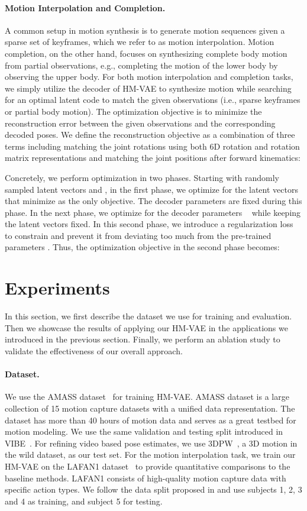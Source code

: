 \paragraph{Motion Interpolation and Completion.}
A common setup in motion synthesis is to generate motion sequences given a sparse set of keyframes, which we refer to as motion interpolation. Motion completion, on the other hand, focuses on synthesizing complete body motion from partial observations, e.g., completing the motion of the lower body by observing the upper body. For both motion interpolation and completion tasks, we simply utilize the decoder of HM-VAE to synthesize motion while searching for an optimal latent code to match the given observations (i.e., sparse keyframes or partial body motion). The optimization objective is to minimize the reconstruction error between the given observations and the corresponding decoded poses. We define the reconstruction objective as a combination of three terms including matching the joint rotations using both 6D rotation and rotation matrix representations and matching the joint positions after forward kinematics:

Concretely, we perform optimization in two phases. Starting with randomly sampled latent vectors  and , in the first phase, we optimize for the latent vectors that minimize  as the only objective. The decoder parameters  are fixed during this phase. In the next phase, we optimize for the decoder parameters ~\cite{yang2020deep} while keeping the latent vectors fixed. In this second phase, we introduce a regularization loss to constrain  and prevent it from deviating too much from the pre-trained parameters . Thus, the optimization objective in the second phase becomes:  


\section{Experiments}
In this section, we first describe the dataset we use for training and evaluation. Then we showcase the results of applying our HM-VAE in the applications we introduced in the previous section. Finally, we perform an ablation study to validate the effectiveness of our overall approach. 

\paragraph{Dataset.}
We use the AMASS dataset~\cite{mahmood2019amass} for training HM-VAE. AMASS dataset is a large collection of 15 motion capture datasets with a unified data representation. The dataset has more than 40 hours of motion data and serves as a great testbed for motion modeling.  
We use the same validation and testing split introduced in VIBE~\cite{kocabas2020vibe}. 
For refining video based pose estimates, we use 3DPW~\cite{von2018recovering}, a 3D motion in the wild dataset, as our test set.  
For the motion interpolation task, we train our HM-VAE on the LAFAN1 dataset~\cite{harvey2020robust} to provide quantitative comparisons to the baseline methods. LAFAN1 consists of high-quality motion capture data with specific action types. We follow the data split proposed in \cite{harvey2020robust} and use subjects 1, 2, 3 and 4 as training, and subject 5 for testing.

